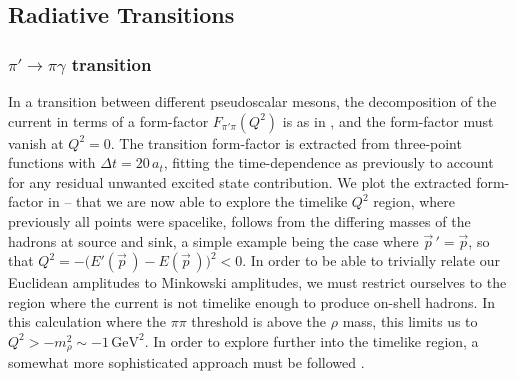 \subsection{Radiative Transitions}



\subsubsection{$\pi' \rightarrow \pi \gamma$ transition}


In a transition between different pseudoscalar mesons, the decomposition of the current in terms of a form-factor $F_{\pi' \pi}(Q^2)$ is as in , and the form-factor must vanish at $Q^2=0$. The transition form-factor is extracted from three-point functions with $\Delta t = 20 \, a_t$, fitting the time-dependence as previously to account for any residual unwanted excited state contribution. We plot the extracted form-factor in  -- that we are now able to explore the timelike $Q^2$ region, where previously all points were spacelike, follows from the differing masses of the hadrons at source and sink, a simple example being the case where $\vec{p}\,' = \vec{p}$, so that ${Q^2 = - \big( E'(\vec{p}\,) - E(\vec{p}\,) \big)^2 < 0}$. In order to be able to trivially relate our Euclidean amplitudes to Minkowski amplitudes, we must restrict ourselves to the region where the current is not timelike enough to produce on-shell hadrons. In this calculation where the $\pi \pi$ threshold is above the $\rho$ mass, this limits us to ${  Q^2 > - m_\rho^2 \sim - 1\,\mathrm{GeV}^2  }$. In order to explore further into the timelike region, a somewhat more sophisticated approach must be followed \cite{Meyer:2011um, Feng:2014gba}.




